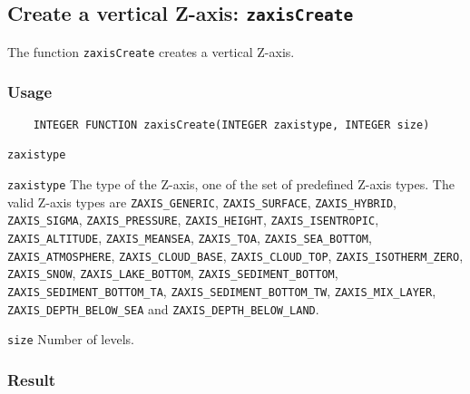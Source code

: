 

\subsection{Create a vertical Z-axis: \texttt{zaxisCreate}}
\label{zaxisCreate}

The function {\texttt{zaxisCreate}} creates a vertical Z-axis.

\subsubsection*{Usage}

\begin{verbatim}
    INTEGER FUNCTION zaxisCreate(INTEGER zaxistype, INTEGER size)
\end{verbatim}

\hspace*{4mm}\begin{minipage}[]{15cm}
\begin{deflist}{\texttt{zaxistype}\ }
\item[\texttt{zaxistype}]
The type of the Z-axis, one of the set of predefined {\CDI} Z-axis types.
                      The valid {\CDI} Z-axis types are {\texttt{ZAXIS\_GENERIC}}, {\texttt{ZAXIS\_SURFACE}},
                      {\texttt{ZAXIS\_HYBRID}}, {\texttt{ZAXIS\_SIGMA}}, {\texttt{ZAXIS\_PRESSURE}}, {\texttt{ZAXIS\_HEIGHT}},
                      {\texttt{ZAXIS\_ISENTROPIC}}, {\texttt{ZAXIS\_ALTITUDE}}, {\texttt{ZAXIS\_MEANSEA}}, {\texttt{ZAXIS\_TOA}},
                      {\texttt{ZAXIS\_SEA\_BOTTOM}}, {\texttt{ZAXIS\_ATMOSPHERE}}, {\texttt{ZAXIS\_CLOUD\_BASE}},
                      {\texttt{ZAXIS\_CLOUD\_TOP}}, {\texttt{ZAXIS\_ISOTHERM\_ZERO}}, {\texttt{ZAXIS\_SNOW}},
                      {\texttt{ZAXIS\_LAKE\_BOTTOM}}, {\texttt{ZAXIS\_SEDIMENT\_BOTTOM}}, {\texttt{ZAXIS\_SEDIMENT\_BOTTOM\_TA}},
                      {\texttt{ZAXIS\_SEDIMENT\_BOTTOM\_TW}}, {\texttt{ZAXIS\_MIX\_LAYER}},
                      {\texttt{ZAXIS\_DEPTH\_BELOW\_SEA}} and {\texttt{ZAXIS\_DEPTH\_BELOW\_LAND}}.
\item[\texttt{size}]
Number of levels.

\end{deflist}
\end{minipage}

\subsubsection*{Result}

